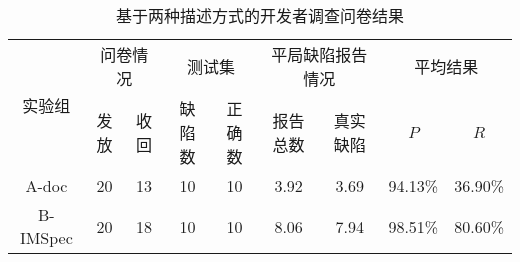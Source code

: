 \begin{table}[b]
	\centering
	\begin{minipage}[t]{\linewidth} %
		\caption{基于两种描述方式的开发者调查问卷结果}
		\label{tab:2-5-survey}
			\begin{tabular}{ccccccccc}
			\hline
			\multirow{2}{*}{实验组} & \multicolumn{2}{c}{问卷情况} & \multicolumn{2}{c}{测试集} & \multicolumn{2}{c}{平局缺陷报告情况} & \multicolumn{2}{c}{平均结果} \\
			\cline{2-9}
			& 发放 & 收回 & 缺陷数& 正确数& 报告总数 & 真实缺陷 & $P$ & $R$ \\
			\hline
		A-doc	& 20 & 13 & 10& 10& 3.92 & 3.69 & 94.13\% & 36.90\% \\
		 B-IMSpec	& 20 & 18 & 10& 10& 8.06 & 7.94 & 98.51\% & 80.60\% \\
			\hline
		\end{tabular}
	\end{minipage}
\end{table}